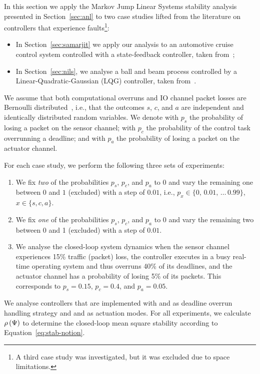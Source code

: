 In this section we apply the Markov Jump Linear Systems stability analysis presented in Section~\ref{sec:anl} to two case studies lifted from the literature on controllers that experience faults\footnote{A third case study was investigated, but it was excluded due to space limitations.}:
\begin{itemize}
    \item In Section~\ref{sec:samarjit} we apply our analysis to an automotive cruise control system controlled with a state-feedback controller, taken from~\cite{Ghosh:2018};
    \item In Section~\ref{sec:nils}, we analyse a ball and beam process controlled by a Linear-Quadratic-Gaussian (LQG) controller, taken from~\cite{Vreman:2022}.
\end{itemize}
We assume that both computational overruns and IO channel packet losses are Bernoulli distributed~\cite{Schenato:2007}, i.e., that the outcomes $s$, $c$, and $a$ are independent and identically distributed random variables.
We denote with $p_s$ the probability of losing a packet on the sensor channel; with $p_c$ the probability of the control task overrunning a deadline; and with $p_a$ the probability of losing a packet on the actuator channel.

For each case study, we perform the following three sets of experiments:
%
\begin{enumerate}[label=(\roman*)]
    \item \label{exp:twofixed} We fix \emph{two} of the probabilities $p_s$, $p_c$, and $p_a$ to $0$ and vary the remaining one between $0$ and $1$ (excluded) with a step of $0.01$, i.e., $p_x \in \{0,\,0.01,\,\dots\,0.99\}$, $x \in \{ s, c, a \}$.

    \item \label{exp:onefixed} We fix \emph{one} of the probabilities $p_s$, $p_c$, and $p_a$ to $0$ and vary the remaining two between 0 and 1 (excluded) with a step of $0.01$.

    \item \label{exp:nonefixed} We analyse the closed-loop system dynamics when the sensor channel experiences 15\% traffic (packet) loss, the controller executes in a busy real-time operating system and thus overruns 40\% of its deadlines, and the actuator channel has a probability of losing 5\% of its packets.
        This corresponds to $p_s=0.15$, $p_c=0.4$, and $p_a = 0.05$.
\end{enumerate}
%
We analyse controllers that are implemented with \tK{} and \tS{} as deadline overrun handling strategy and \tZ{} and \tH{} as actuation modes.
For all experiments, we calculate $\rho\left( \Psi \right)$ to determine the closed-loop mean square stability according to Equation~\eqref{eq:stab-notion}.

